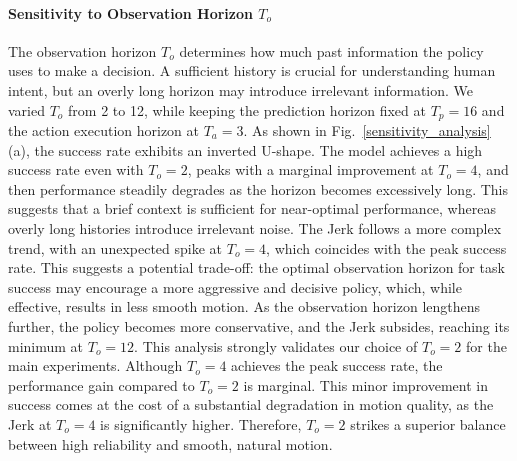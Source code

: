 \documentclass[final,5p,times,twocolumn]{elsarticle}
\begin{document}
\paragraph{Sensitivity to Observation Horizon $T_o$}
The observation horizon $T_o$ determines how much past information the policy uses to make a decision. A sufficient history is crucial for understanding human intent, but an overly long horizon may introduce irrelevant information. We varied $T_o$ from 2 to 12, while keeping the prediction horizon fixed at $T_p=16$ and the action execution horizon at $T_a=3$. As shown in Fig.~\ref{sensitivity_analysis}(a), the success rate exhibits an inverted U-shape. The model achieves a high success rate even with $T_o=2$, peaks with a marginal improvement at $T_o=4$, and then performance steadily degrades as the horizon becomes excessively long. This suggests that a brief context is sufficient for near-optimal performance, whereas overly long histories introduce irrelevant noise. The Jerk follows a more complex trend, with an unexpected spike at $T_o=4$, which coincides with the peak success rate. This suggests a potential trade-off: the optimal observation horizon for task success may encourage a more aggressive and decisive policy, which, while effective, results in less smooth motion. As the observation horizon lengthens further, the policy becomes more conservative, and the Jerk subsides, reaching its minimum at $T_o=12$. This analysis strongly validates our choice of $T_o=2$ for the main experiments. Although $T_o=4$ achieves the peak success rate, the performance gain compared to $T_o=2$ is marginal. This minor improvement in success comes at the cost of a substantial degradation in motion quality, as the Jerk at $T_o=4$ is significantly higher. Therefore, $T_o=2$ strikes a superior balance between high reliability and smooth, natural motion.
\end{document}
